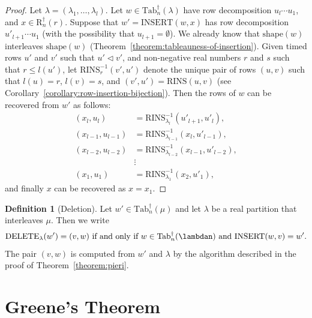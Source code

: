 \documentclass[10pt]{amsproc}
\theoremstyle{definition}
\newtheorem{definition}[theorem]{Definition}
\theoremstyle{remark}
\newcommand{\rowins}{\mathrm{RINS}}
\newcommand{\ins}{\mathrm{INSERT}}
\newcommand{\del}{\mathrm{DELETE}}
\newcommand{\shape}{\mathrm{shape}}
\newcommand{\ttab}{\mathrm{Tab}^\dagger}
\newcommand{\tr}{\mathrm{R}^\dagger}
\begin{document}
\begin{proof}
  Let $\lambda=(\lambda_1,\dotsc,\lambda_l)$.
  Let $w\in \ttab_n(\lambda)$ have row decomposition $u_l\dotsb u_1$, and $x\in \tr_n(r)$.
  Suppose that $w'=\ins(w,x)$ has row decomposition $u'_{l+1}\dotsb u_1$ (with the possibility that $u_{l+1}=\emptyset$).
  We already know that $\shape(w)$ interleaves $\shape(w)$ (Theorem~\ref{theorem:tableauness-of-insertion}).
  Given timed rows $u'$ and $v'$ such that $u'\lhd v'$, and non-negative real numbers $r$ and $s$ such that $r\leq l(u')$, let $\rowins^{-1}_r(v',u')$ denote the unique pair of rows $(u,v)$ such that $l(u)=r$, $l(v)=s$, and $(v',u')=\rowins(u,v)$ (see Corollary~\ref{corollary:row-insertion-bijection}).
  Then the rows of $w$ can be recovered from $w'$ as follows:
  \begin{align*}
    (x_l, u_l) & = \rowins^{-1}_{\lambda_l}(u'_{l+1},u'_l),\\
    (x_{l-1},u_{l-1}) & = \rowins^{-1}_{\lambda_{l-1}}(x_l,u'_{l-1}),\\
    (x_{l-2},u_{l-2}) & = \rowins^{-1}_{\lambda_{l-2}}(x_{l-1},u'_{l-2}),\\
    &\vdots\\
    (x_1,u_1) & = \rowins^{-1}_{\lambda_1}(x_2,u'_1),
  \end{align*}
  and finally $x$ can be recovered as $x=x_1$.
\end{proof}
\begin{definition}
  [Deletion]
  \label{definition:deletion}
  Let $w'\in \ttab_n(\mu)$ and let $\lambda$ be a real partition that interleaves $\mu$.
  Then we write
  \begin{displaymath}
    \del_\lambda(w')=(v,w) \text{ if and only if } w\in \ttab_n(\lambdan) \text{ and }\ins(w,v)=w'.
  \end{displaymath}
  The pair $(v,w)$ is computed from $w'$ and $\lambda$ by the algorithm described in the proof of Theorem~\ref{theorem:pieri}.
\end{definition}
\section{Greene's Theorem}
\label{sec:greene}
\end{document}
